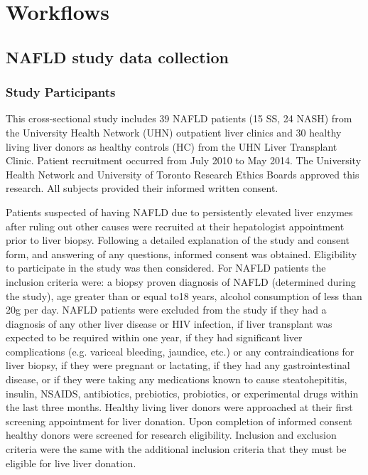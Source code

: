 \chapter{Workflows}\label{AppB}
\section{NAFLD study data collection}

\subsection{Study Participants}
This cross-sectional study includes 39 NAFLD patients (15 SS, 24 NASH) from the University Health Network (UHN) outpatient liver clinics and 30 healthy living liver donors as healthy controls (HC) from the UHN Liver Transplant Clinic. Patient recruitment occurred from July 2010 to May 2014. The University Health Network and University of Toronto Research Ethics Boards approved this research. All subjects provided their informed written consent.

Patients suspected of having NAFLD due to persistently elevated liver enzymes after ruling out other causes were recruited at their hepatologist appointment prior to liver biopsy. Following a detailed explanation of the study and consent form, and answering of any questions, informed consent was obtained. Eligibility to participate in the study was then considered. For NAFLD patients the inclusion criteria were: a biopsy proven diagnosis of NAFLD (determined during the study), age greater than or equal to18 years, alcohol consumption of less than 20g per day. NAFLD patients were excluded from the study if they had a diagnosis of any other liver disease or HIV infection, if liver transplant was expected to be required within one year, if they had significant liver complications (e.g. variceal bleeding, jaundice, etc.) or any contraindications for liver biopsy, if they were pregnant or lactating, if they had any gastrointestinal disease, or if they were taking any medications known to cause steatohepititis, insulin, NSAIDS, antibiotics, prebiotics, probiotics, or experimental drugs within the last three months. Healthy living liver donors were approached at their first screening appointment for liver donation. Upon completion of informed consent healthy donors were screened for research eligibility. Inclusion and exclusion criteria were the same with the additional inclusion criteria that they must be eligible for live liver donation.

